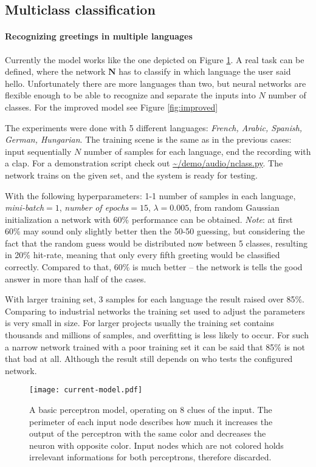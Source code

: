 \subsection{Multiclass classification}
\paragraph{Recognizing greetings in multiple languages}
Currently the model works like the one depicted on Figure \ref{fig:dumb}. 
A real task can be defined, where the network $\mathbf{N}$ has to classify in which language the user said hello. Unfortunately there are more languages than two, but neural networks are flexible enough to be able to recognize and separate the inputs into  $N$ number of classes. For the improved model see Figure \ref{fig:improved} 

The experiments were done with 5 different languages: \emph{French, Arabic, Spanish, German, Hungarian}. The training scene is the same as in the previous cases: input sequentially $N$ number of samples for each language, end the recording with a clap.
For a demonstration script check out \cite{DV} \url{~/demo/audio/nclass.py}.
The network trains on the given set, and the system is ready for testing.

With the following hyperparameters: 1-1 number of samples in each language, \emph{mini-batch}$=1$, \emph{number of epochs}$=15$, $\lambda=0.005$, from random Gaussian initialization a network with 60\% performance can be obtained.
\emph{Note}: at first 60\% may sound only slightly better then the 50-50 guessing, but considering the fact that the random guess would be distributed now between 5 classes, resulting in 20\% hit-rate, meaning that only every fifth greeting would be classified correctly. 
Compared to that, 60\% is much better -- the network is tells the good answer in more than half of the cases.

With larger training set, 3 samples for each language the result raised over 85\%. Comparing to industrial networks the training set used to adjust the parameters is very small in size. 
For larger projects usually the training set contains thousands and millions of samples, and overfitting is less likely to occur. 
For such a narrow network trained with a poor training set it can be said that 85\% is not that bad at all. Although the result still depends on who tests the configured network.

\begin{figure}
	\centering
	\texttt{[image: current-model.pdf]}
	\caption{A basic perceptron model, operating on 8 clues of the input. The perimeter of each input node describes how much it increases the output of the perceptron with the same color and decreases the neuron with opposite color. Input nodes which are not colored holds irrelevant informations for both perceptrons, therefore discarded.}
	
	\label{fig:dumb}
\end{figure}


